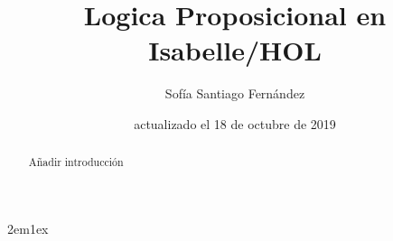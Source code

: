 \documentclass[12pt,a4paper]{article}
\begin{document}
\title{Logica Proposicional en Isabelle/HOL}
\author{Sofía Santiago Fernández}
\date{actualizado el 18 de octubre de 2019}
\maketitle

\begin{abstract}
  Añadir introducción
\end{abstract}

\tableofcontents

\parindent 2em\parskip 1ex



\nocite{LMF, tutorial,fitting1996first}


\end{document}
